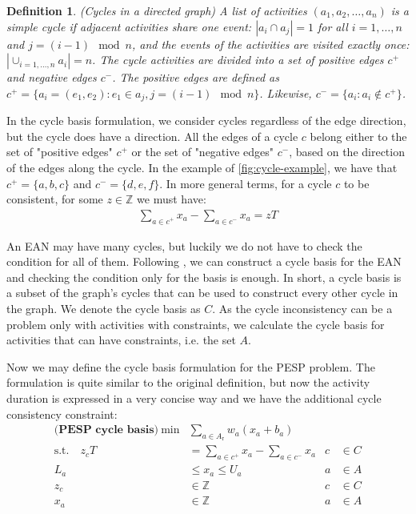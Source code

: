 \documentclass[english, 12pt, a4paper, sci, utf8, a-2b, online]{aaltothesis}
\newtheorem{definition}{Definition}
\newcommand{\Z}{\mathbb{Z}}
\newcommand{\Ar}{A_\text{r}}
\begin{document}
\begin{definition}{(Cycles in a directed graph)}
    A list of activities $(a_1, a_2, \dots, a_n)$ is a simple cycle if 
    adjacent activities share one event: $|a_i\cap a_{j}| = 1$ for all $i = {1, \dots, n}$ and $j = (i - 1 ) \mod n$, and the events of the activities are visited exactly once: $|\cup_{i=1,\dots, n}a_i| = n$. The cycle activities are divided into a set of positive edges $c^+$ and negative edges $c^-$. The positive edges are defined as $c^+ = \{a_i = (e_1, e_2) : e_1 \in a_j, j = (i - 1) \mod n\}$. Likewise, $c^- = \{a_i : a_i \notin c^+\}$.
\end{definition}

In the cycle basis formulation, we consider cycles regardless of the edge direction, but the cycle does have a direction. All the edges of a cycle $c$ belong either to the set of "positive edges" $c^+$ or the set of "negative edges" $c^-$, based on the direction of the edges along the cycle. In the example of \cref{fig:cycle-example}, we have that $c^+ = \{a, b, c\}$ and $c^- = \{d, e, f\}$. In more general terms, for a cycle $c$ to be consistent, for some $z \in \Z$ we must have:
\begin{align}
    \sum_{a\in c^+}x_a - \sum_{a \in c^-}x_a = zT
\end{align}

An EAN may have many cycles, but luckily we do not have to check the condition for all of them. Following \cite{cycle-basis-original-2001}, we can construct a cycle basis for the EAN and checking the condition only for the basis is enough. In short, a cycle basis is a subset of the graph's cycles that can be used to construct every other cycle in the graph. We denote the cycle basis as $C$. As the cycle inconsistency can be a problem only with activities with constraints, we calculate the cycle basis for activities that can have constraints, i.e. the set $A$.



Now we may define the cycle basis formulation for the PESP problem. The formulation is quite similar to the original definition, but now the activity duration is expressed in a very concise way and we have the additional cycle consistency constraint:
\begin{align}
    \textbf{(PESP cycle basis)}\ \min &  \sum_{a \in \Ar} w_{a} (x_a + b_a) \\
    \textrm{s.t.} \quad  z_c T &= \sum_{a\in c^+} x_a - \sum_{a\in c^-} x_a &c &\in C \\
    L_a &\leq x_a  \leq U_a &a &\in A \\
    z_c &\in \Z &c& \in C \\
    x_a &\in \Z &a& \in A
\end{align}
\end{document}
